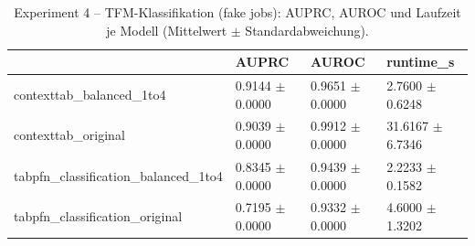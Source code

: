 \begin{table}
\centering
\caption{Experiment 4 -- TFM-Klassifikation (fake jobs): AUPRC, AUROC und Laufzeit je Modell (Mittelwert $\pm$ Standardabweichung).}
\label{tab:exp4_fake_jobs}
\begin{tabular}{llll}
\toprule
 & \bfseries AUPRC & \bfseries AUROC & \bfseries runtime\_s \\
\midrule
contexttab\_balanced\_1to4 & 0.9144 $\pm$ 0.0000 & 0.9651 $\pm$ 0.0000 & 2.7600 $\pm$ 0.6248 \\
contexttab\_original & 0.9039 $\pm$ 0.0000 & 0.9912 $\pm$ 0.0000 & 31.6167 $\pm$ 6.7346 \\
tabpfn\_classification\_balanced\_1to4 & 0.8345 $\pm$ 0.0000 & 0.9439 $\pm$ 0.0000 & 2.2233 $\pm$ 0.1582 \\
tabpfn\_classification\_original & 0.7195 $\pm$ 0.0000 & 0.9332 $\pm$ 0.0000 & 4.6000 $\pm$ 1.3202 \\
\bottomrule
\end{tabular}
\end{table}

